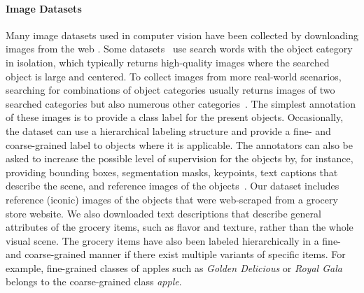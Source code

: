 \paragraph{Image Datasets} Many image datasets used in computer vision have been collected by downloading images from the web . 
Some datasets~ use search words with the object category in isolation, which typically returns high-quality images where the searched object is large and centered. To collect images from more real-world scenarios, searching for combinations of object categories usually returns images of two searched categories but also numerous other categories~. 
The simplest annotation of these images is to provide a class label for the present objects. Occasionally, the dataset can use a hierarchical labeling structure and provide a fine- and coarse-grained label to objects where it is applicable. 
The annotators can also be asked to increase the possible level of supervision for the objects by, for instance, providing bounding boxes, segmentation masks, keypoints, text captions that describe the scene, and reference images of the objects~. Our dataset includes reference (iconic) images of the objects that were web-scraped from a grocery store website. We also downloaded text descriptions that describe general attributes of the grocery items, such as flavor and texture, rather than the whole visual scene. The grocery items have also been labeled hierarchically in a fine- and coarse-grained manner if there exist multiple variants of specific items. For example, fine-grained classes of apples such as \textit{Golden Delicious} or \textit{Royal Gala} belongs to the coarse-grained class \textit{apple}.

\vspace{-3mm}
